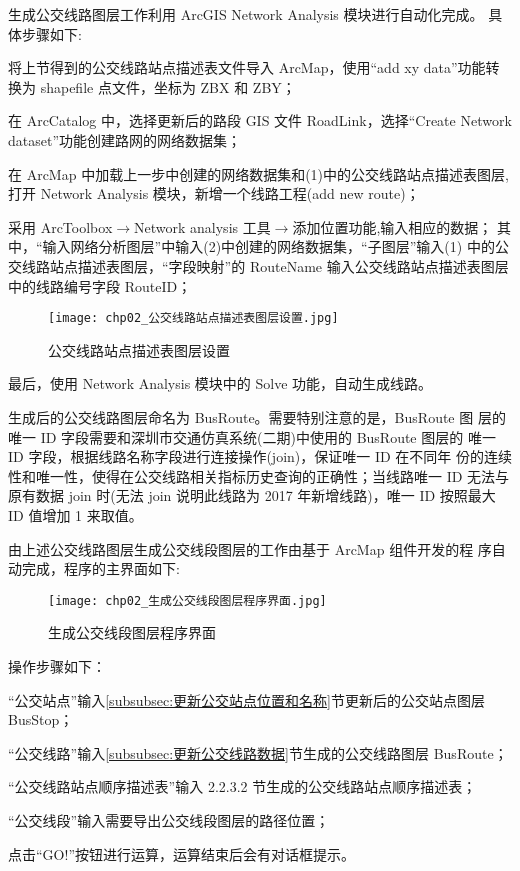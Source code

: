 生成公交线路图层工作利用 ArcGIS Network Analysis 模块进行自动化完成。
具体步骤如下:

\begin{nbeae}
\item 将上节得到的公交线路站点描述表文件导入 ArcMap，使用“add
xy data”功能转换为 shapefile 点文件，坐标为 ZBX 和 ZBY；
\item 在 ArcCatalog 中，选择更新后的路段 GIS 文件 RoadLink，选择“Create Network
dataset”功能创建路网的网络数据集；
\item 在 ArcMap 中加载上一步中创建的网络数据集和(1)中的公交线路站点描述表图层,
打开 Network Analysis 模块，新增一个线路工程(add new route)；
\item 采用 ArcToolbox$\rightarrow$Network analysis 工具$\rightarrow$添加位置功能,输入相应的数据；
其中，“输入网络分析图层”中输入(2)中创建的网络数据集，“子图层”输入(1)
中的公交线路站点描述表图层，“字段映射”的 RouteName 输入公交线路站点描述表图层中的线路编号字段 RouteID；
\begin{figure}[!htbp]
  \centering
  \texttt{[image: chp02\_公交线路站点描述表图层设置.jpg]}
  \caption{公交线路站点描述表图层设置\label{fig:公交线路站点描述表图层设置} }
\end{figure}
\item 最后，使用 Network Analysis 模块中的 Solve 功能，自动生成线路。
\end{nbeae}

生成后的公交线路图层命名为 BusRoute。需要特别注意的是，BusRoute 图
层的唯一 ID 字段需要和深圳市交通仿真系统(二期)中使用的 BusRoute 图层的
唯一 ID 字段，根据线路名称字段进行连接操作(join)，保证唯一 ID 在不同年
份的连续性和唯一性，使得在公交线路相关指标历史查询的正确性；当线路唯一
ID 无法与原有数据 join 时(无法 join 说明此线路为 2017 年新增线路)，唯一 ID
按照最大 ID 值增加 1 来取值。


由上述公交线路图层生成公交线段图层的工作由基于 ArcMap 组件开发的程
序自动完成，程序的主界面如下:
\begin{figure}[!htbp]
  \centering
  \texttt{[image: chp02\_生成公交线段图层程序界面.jpg]}
  \caption{生成公交线段图层程序界面\label{fig:生成公交线段图层程序界面} }
\end{figure}

操作步骤如下：
\begin{nbeae}
\item “公交站点”输入\ref{subsubsec:更新公交站点位置和名称}节更新后的公交站点图层 BusStop；
\item “公交线路”输入\ref{subsubsec:更新公交线路数据}节生成的公交线路图层 BusRoute；
\item “公交线路站点顺序描述表”输入 2.2.3.2 节生成的公交线路站点顺序描述表；
\item “公交线段”输入需要导出公交线段图层的路径位置；
\item 点击“GO!”按钮进行运算，运算结束后会有对话框提示。
\end{nbeae}

